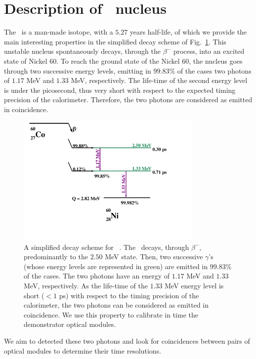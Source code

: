 \section{Description of \Co\ nucleus}
\label{subsec:CoSource}
The \Co\ is a man-made isotope, with a $5.27$ years half-life, of which we provide the main interesting properties in the simplified decay scheme of Fig.~\ref{fig:Co_decay_scheme}.
This unstable nucleus spontaneously decays, through the $\beta^{-}$ process, into an excited state of Nickel $60$.
To reach the ground state of the Nickel $60$, the nucleus goes through two successive energy levels, emitting in $99.83$\% of the cases two photons of $1.17$ MeV and $1.33$ MeV, respectively.
The life-time of the second energy level is under the picosecond, thus very short with respect to the expected timing precision of the calorimeter.
Therefore, the two photons are considered as emitted in coincidence.
\begin{figure}[h]
  \centering
  \includegraphics[width=9cm]{commissioning/fig_commissioning/Co_decay_scheme.pdf}
  \caption{A simplified decay scheme for \Co~\cite{web:nucleide}.
    The \Co\ decays, through $\beta^{-}$, predominantly to the $2.50$ MeV state.
    Then, two successive $\gamma$'s (whose energy levels are represented in green) are emitted in $99.83$\% of the cases.
    The two photons have an energy of $1.17$ MeV and $1.33$ MeV, respectively.
    As the life-time of the $1.33$ MeV energy level is short ($<1$ ps) with respect to the timing precision of the calorimeter, the two photons can be considered as emitted in coincidence.
    We use this property to calibrate in time the demonstrator optical modules.
    \label{fig:Co_decay_scheme}}
\end{figure}

We aim to detected these two photons and look for coincidences between pairs of optical modules to determine their time resolutions.


